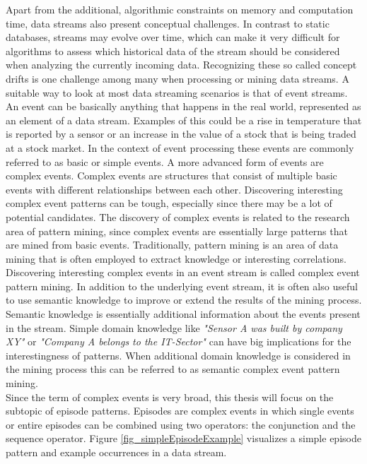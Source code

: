 Apart from the additional, algorithmic constraints on memory and computation time, data streams also present conceptual challenges. In contrast to static databases, streams may evolve over time, which can make it very difficult for algorithms to assess which historical data of the stream should be considered when analyzing the currently incoming data. Recognizing these so called concept drifts is one challenge among many when processing or mining data streams. \newline
A suitable way to look at most data streaming scenarios is that of event streams. An event can be basically anything that happens in the real world, represented as an element of a data stream. Examples of this could be a rise in temperature that is reported by a sensor or an increase in the value of a stock that is being traded at a stock market. In the context of event processing these events are commonly referred to as basic or simple events. \newline
A more advanced form of events are complex events. Complex events are structures that consist of multiple basic events with different relationships between each other. Discovering interesting complex event patterns can be tough, especially since there may be a lot of potential candidates. The discovery of complex events is related to the research area of pattern mining, since complex events are essentially large patterns that are mined from basic events. Traditionally, pattern mining is an area of data mining that is often employed to extract knowledge or interesting correlations. Discovering interesting complex events in an event stream is called complex event pattern mining. In addition to the underlying event stream, it is often also useful to use semantic knowledge to improve or extend the results of the mining process. Semantic knowledge is essentially additional information about the events present in the stream. Simple domain knowledge like \textit{"Sensor A was built by company XY"} or \textit{"Company A belongs to the IT-Sector"} can have big implications for the interestingness of patterns. When additional domain knowledge is considered in the mining process this can be referred to as semantic complex event pattern mining. \\
Since the term of complex events is very broad, this thesis will focus on the subtopic of episode patterns. Episodes are complex events in which single events or entire episodes can be combined using two operators: the conjunction and the sequence operator. Figure \ref{fig_simpleEpisodeExample} visualizes a simple episode pattern and example occurrences in a data stream.

